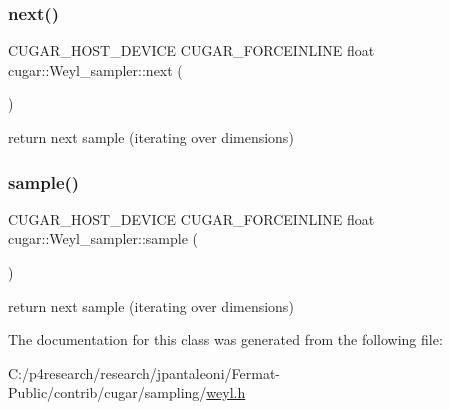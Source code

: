 \subsubsection{\texorpdfstring{next()}{next()}}
{\footnotesize\ttfamily C\+U\+G\+A\+R\+\_\+\+H\+O\+S\+T\+\_\+\+D\+E\+V\+I\+CE C\+U\+G\+A\+R\+\_\+\+F\+O\+R\+C\+E\+I\+N\+L\+I\+NE float cugar\+::\+Weyl\+\_\+sampler\+::next (\begin{DoxyParamCaption}{ }\end{DoxyParamCaption})\hspace{0.3cm}{\ttfamily [inline]}}

return next sample (iterating over dimensions) \mbox{\label{classcugar_1_1_weyl__sampler_a0d71d08672aadb68aca1b97f2c1ddda0}} 
\subsubsection{\texorpdfstring{sample()}{sample()}}
{\footnotesize\ttfamily C\+U\+G\+A\+R\+\_\+\+H\+O\+S\+T\+\_\+\+D\+E\+V\+I\+CE C\+U\+G\+A\+R\+\_\+\+F\+O\+R\+C\+E\+I\+N\+L\+I\+NE float cugar\+::\+Weyl\+\_\+sampler\+::sample (\begin{DoxyParamCaption}{ }\end{DoxyParamCaption})\hspace{0.3cm}{\ttfamily [inline]}}

return next sample (iterating over dimensions) 

The documentation for this class was generated from the following file\+:\begin{DoxyCompactItemize}
\item 
C\+:/p4research/research/jpantaleoni/\+Fermat-\/\+Public/contrib/cugar/sampling/\hyperlink{weyl_8h}{weyl.\+h}\end{DoxyCompactItemize}
